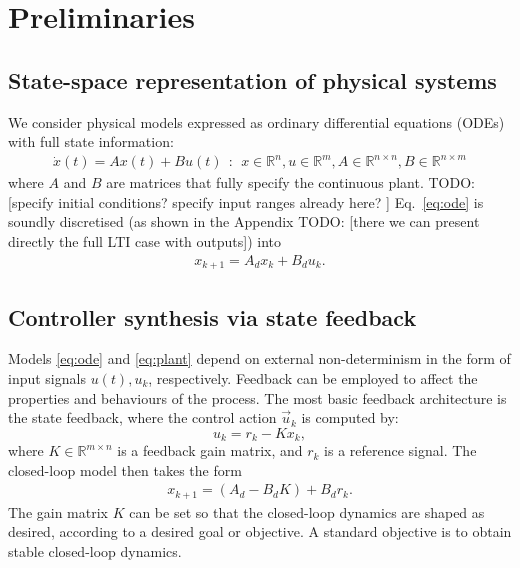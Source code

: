 \documentclass[runningheads,a4paper]{llncs}
\newcommand{\todo}[1]{{\color{red} TODO: #1}}
\begin{document}

\section{Preliminaries}
\label{sec:preliminaries}

\subsection{State-space representation of physical systems} 
\label{ssec:ssrepresentation}

We consider physical models expressed as ordinary differential equations (ODEs) with full state information:  
%
\begin{align}
\label{eq:ode}
\dot{x}(t) = Ax(t)+ B u(t)\ \ :\ \ x \in \mathbb{R}^{n}, u \in \mathbb{R}^m, A \in \mathbb{R}^{n \times n}, B \in \mathbb{R}^{n \times m}
\end{align}
where $A$ and $B$ are matrices that fully specify the continuous plant.  
\todo{[specify initial conditions? specify input ranges already here? ]} 
Eq.~\eqref{eq:ode} is soundly discretised (as shown in the Appendix \todo{[there we can present directly the full LTI case with outputs]}) into
%
\begin{align}
\label{eq:plant}
x_{k+1} = A_d x_k+ B_d u_k. 
\end{align}
%

\subsection{Controller synthesis via state feedback}
\label{ssec:statefeedbackcontrol}

Models \eqref{eq:ode} and \eqref{eq:plant} depend on external non-determinism in the form of input signals $u (t), u_k$, respectively. 
Feedback can be employed to affect the properties and behaviours of the process. 
The most basic feedback architecture is the state feedback, 
where the control action $\vec{u}_k$ is computed by: 
%
\begin{equation}
\label{eq:controlaction}
u_k = r_{k} - K x_k, 
\end{equation}
%
where $K \in \mathbb{R}^{m \times n}$ is a feedback gain matrix, 
and $r_{k}$ is a reference signal.   
%
The closed-loop model then takes the form 
\begin{align}
\label{eq:closedloopss}
x_{k+1} = ( A_d - B_d K ) + B_d r_k.
\end{align}
The gain matrix $K$ can be set so that the closed-loop dynamics are shaped as desired, 
according to a desired goal or objective. 
A standard objective is to obtain stable closed-loop dynamics. 
\end{document}
